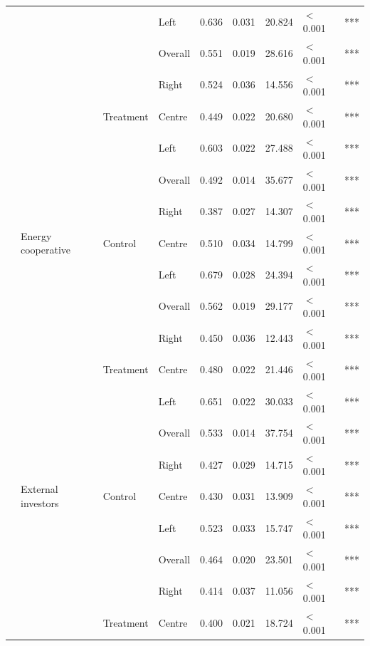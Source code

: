 \begin{longtable}[t]{>{\raggedright\arraybackslash}t{3cm}>{\raggedright\arraybackslash}t{3cm}>{\raggedright\arraybackslash}t{2.5cm}lrrrll}
\nopagebreak
 &  &  & Left & 0.636 & 0.031 & 20.824 & $<$0.001 & ***\\
\nopagebreak
 &  &  & Overall & 0.551 & 0.019 & 28.616 & $<$0.001 & ***\\
\nopagebreak
 &  &  & Right & 0.524 & 0.036 & 14.556 & $<$0.001 & ***\\
\nopagebreak
 &  & Treatment & Centre & 0.449 & 0.022 & 20.680 & $<$0.001 & ***\\
\nopagebreak
 &  &  & Left & 0.603 & 0.022 & 27.488 & $<$0.001 & ***\\
\nopagebreak
 &  &  & Overall & 0.492 & 0.014 & 35.677 & $<$0.001 & ***\\
\nopagebreak
 &  &  & Right & 0.387 & 0.027 & 14.307 & $<$0.001 & ***\\
\nopagebreak
 & Energy cooperative & Control & Centre & 0.510 & 0.034 & 14.799 & $<$0.001 & ***\\
\nopagebreak
 &  &  & Left & 0.679 & 0.028 & 24.394 & $<$0.001 & ***\\
\nopagebreak
 &  &  & Overall & 0.562 & 0.019 & 29.177 & $<$0.001 & ***\\
\nopagebreak
 &  &  & Right & 0.450 & 0.036 & 12.443 & $<$0.001 & ***\\
\nopagebreak
 &  & Treatment & Centre & 0.480 & 0.022 & 21.446 & $<$0.001 & ***\\
\nopagebreak
 &  &  & Left & 0.651 & 0.022 & 30.033 & $<$0.001 & ***\\
\nopagebreak
 &  &  & Overall & 0.533 & 0.014 & 37.754 & $<$0.001 & ***\\
\nopagebreak
 &  &  & Right & 0.427 & 0.029 & 14.715 & $<$0.001 & ***\\
\nopagebreak
 & External investors & Control & Centre & 0.430 & 0.031 & 13.909 & $<$0.001 & ***\\
\nopagebreak
 &  &  & Left & 0.523 & 0.033 & 15.747 & $<$0.001 & ***\\
\nopagebreak
 &  &  & Overall & 0.464 & 0.020 & 23.501 & $<$0.001 & ***\\
\nopagebreak
 &  &  & Right & 0.414 & 0.037 & 11.056 & $<$0.001 & ***\\
\nopagebreak
 &  & Treatment & Centre & 0.400 & 0.021 & 18.724 & $<$0.001 & ***\\

\end{longtable}
